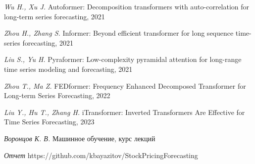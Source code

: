 \begin{thebibliography}{99}
    \textit{Wu H., Xu J.} Autoformer: Decomposition transformers with auto-correlation for long-term series forecasting, 2021

    \textit{Zhou H., Zhang S.} Informer: Beyond efficient transformer for long sequence time-series forecasting, 2021

    \textit{Liu S., Yu H.} Pyraformer: Low-complexity pyramidal attention for long-range time series modeling and forecasting, 2021

    \textit{Zhou T., Ma Z.} FEDformer: Frequency Enhanced Decomposed Transformer for Long-term Series Forecasting, 2022
    
    \textit{Liu Y., Hu T., Zhang H.} iTransformer: Inverted Transformers Are Effective for Time Series Forecasting, 2023

    \textit{Воронцов К. В.} Машинное обучение, курс лекций
    
    \textit{Отчет} https://github.com/kbayazitov/StockPricingForecasting
	
\end{thebibliography}